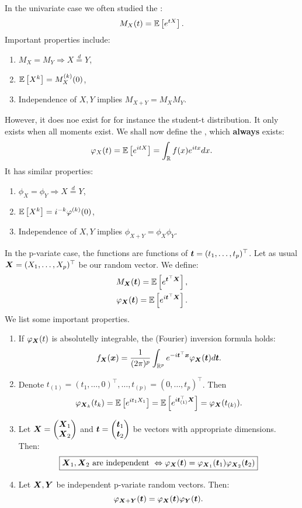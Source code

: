 In the univariate case we often studied the :
$$
    M_X(t) = \mathbb{E}\left[e^{tX}\right].
$$
Important properties include:
\begin{enumerate}
    \item $M_X = M_Y \Rightarrow X \overset{d}{=} Y$,
    \item $\mathbb{E}\left[X^k\right] = M^{(k)}_X(0)$,
    \item Independence of $X, Y$ implies $M_{X+Y} = M_X M_Y$.
\end{enumerate}
However, it does noe exist for for instance the student-t distribution. It only exists when all moments exist. We shall now define the , which \textbf{always} exists:
$$
    \varphi_X(t) = \mathbb{E}\left[e^{itX}\right] = \int_\mathbb{R} f(x) e^{itx} dx.
$$
It has similar properties:
\begin{enumerate}
    \item $\phi_X = \phi_Y \Rightarrow X \overset{d}{=} Y$,
    \item $\mathbb{E}\left[X^k\right] = i^{-k} \varphi^{(k)}(0)$,
    \item Independence of $X, Y$ implies $\phi_{X+Y} = \phi_X \phi_Y$.
\end{enumerate}
In the p-variate case, the functions are functions of $\boldsymbol{t}=(t_1,\dots,t_p)^\top$. Let as usual $\boldsymbol{X}=(X_1,\dots,X_p)^\top$ be our random vector. We define:
\begin{align*}
    M_{\boldsymbol{X}}(\boldsymbol{t}) = \mathbb{E}\left[e^{\boldsymbol{t}^\top \boldsymbol{X}}\right], \\
    \varphi_{\boldsymbol{X}}(\boldsymbol{t}) = \mathbb{E}\left[e^{i\boldsymbol{t}^\top \boldsymbol{X}}\right].
\end{align*}
We list some important properties.
\begin{enumerate}
    \item If $\varphi_{\boldsymbol{X}}(t)$ is absolutelly integrable, the (Fourier) inversion formula holds:
    $$
        f_{\boldsymbol{X}}(\boldsymbol{x}) = \frac{1}{(2\pi)^p} \int_{\mathbb{R}^p} e^{-i\boldsymbol{t}^\top\boldsymbol{x}} \varphi_{\boldsymbol{X}}(\boldsymbol{t}) d\boldsymbol{t}.
    $$
    \item Denote $t_{(1)} = (t_1,\dots,0)^\top, \dots, t_{(p)}=(0,\dots,t_p)^\top$. Then 
    $$
        \varphi_{\boldsymbol{X}_k}(t_k) = \mathbb{E}\left[e^{it_1 X_1}\right] = \mathbb{E}\left[e^{i\boldsymbol{t}_{(1)}^\top \boldsymbol{X}}\right] =  \varphi_{\boldsymbol{X}}(t_{(k)}).
    $$
    \item Let $\boldsymbol{X}=\begin{pmatrix} \boldsymbol{X}_1 \\ \boldsymbol{X}_2 \end{pmatrix}$ and $\boldsymbol{t}=\begin{pmatrix} \boldsymbol{t}_1 \\ \boldsymbol{t}_2 \end{pmatrix}$ be vectors with appropriate dimensions. Then:
    \begin{equation}
        \boxed{\boldsymbol{X}_1, \boldsymbol{X}_2 \textrm{ are independent } \Leftrightarrow \varphi_{\boldsymbol{X}}(\boldsymbol{t}) = \varphi_{\boldsymbol{X}_1}(\boldsymbol{t}_1)\varphi_{\boldsymbol{X}_2}(\boldsymbol{t}_2)}
    \end{equation} 
    \item Let $\boldsymbol{X}, \boldsymbol{Y}$ be independent p-variate random vectors. Then:
    $$
        \varphi_{\boldsymbol{X}+\boldsymbol{Y}}(\boldsymbol{t}) = \varphi_{\boldsymbol{X}}(\boldsymbol{t})\varphi_{\boldsymbol{Y}}(\boldsymbol{t}).
    $$
\end{enumerate}
